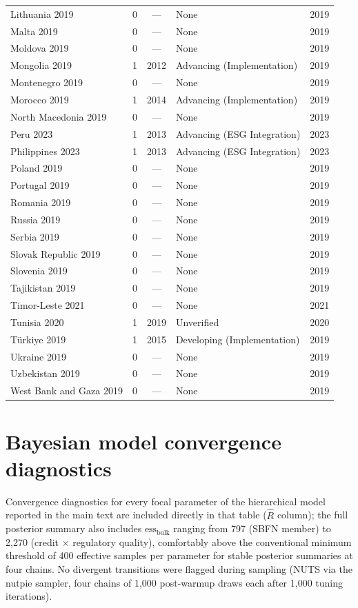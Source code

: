 \documentclass[12pt]{article}
\begin{document}
{\begin{longtable}{p{2.3cm}ccp{4.0cm}c}
Lithuania 2019 & 0 & --- & None & 2019 \\
Malta 2019 & 0 & --- & None & 2019 \\
Moldova 2019 & 0 & --- & None & 2019 \\
Mongolia 2019 & 1 & 2012 & Advancing (Implementation) & 2019 \\
Montenegro 2019 & 0 & --- & None & 2019 \\
Morocco 2019 & 1 & 2014 & Advancing (Implementation) & 2019 \\
North Macedonia 2019 & 0 & --- & None & 2019 \\
Peru 2023 & 1 & 2013 & Advancing (ESG Integration) & 2023 \\
Philippines 2023 & 1 & 2013 & Advancing (ESG Integration) & 2023 \\
Poland 2019 & 0 & --- & None & 2019 \\
Portugal 2019 & 0 & --- & None & 2019 \\
Romania 2019 & 0 & --- & None & 2019 \\
Russia 2019 & 0 & --- & None & 2019 \\
Serbia 2019 & 0 & --- & None & 2019 \\
Slovak Republic 2019 & 0 & --- & None & 2019 \\
Slovenia 2019 & 0 & --- & None & 2019 \\
Tajikistan 2019 & 0 & --- & None & 2019 \\
Timor-Leste 2021 & 0 & --- & None & 2021 \\
Tunisia 2020 & 1 & 2019 & Unverified & 2020 \\
Türkiye 2019 & 1 & 2015 & Developing (Implementation) & 2019 \\
Ukraine 2019 & 0 & --- & None & 2019 \\
Uzbekistan 2019 & 0 & --- & None & 2019 \\
West Bank and Gaza 2019 & 0 & --- & None & 2019 \\
\bottomrule
\end{longtable}
}

\section{Bayesian model convergence diagnostics}
\label{app:diagnostics}

Convergence diagnostics for every focal parameter of the hierarchical model reported in the main
text are included directly in that table ($\hat{R}$ column); the full posterior summary also
includes $\text{ess}_{\text{bulk}}$ ranging from 797 (SBFN member) to 2{,}270 (credit $\times$
regulatory quality), comfortably above the conventional minimum threshold of 400 effective samples
per parameter for stable posterior summaries at four chains. No divergent transitions were flagged
during sampling (NUTS via the nutpie sampler, four chains of 1{,}000 post-warmup draws each after
1{,}000 tuning iterations).
\end{document}
